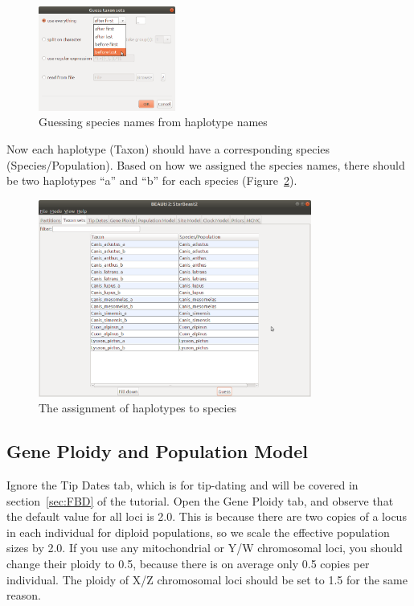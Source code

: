 \documentclass[12pt]{article}
\begin{document}
\begin{figure}[htb!]
\centering
\includegraphics[width=0.4\textwidth]{figures/guessTaxonMap.png}
\caption
{Guessing species names from haplotype names}
\label{fig:guessTaxonMap}
\end{figure}

Now each haplotype (Taxon) should have a corresponding species (Species/Population).
Based on how we assigned the species names, there should be two haplotypes
``a'' and ``b'' for each species (Figure~\ref{fig:taxonMap}).

\begin{figure}[htb!]
\centering
\includegraphics[width=0.8\textwidth]{figures/taxonMap.png}
\caption
{The assignment of haplotypes to species}
\label{fig:taxonMap}
\end{figure}

\clearpage

\subsection{Gene Ploidy and Population Model}
\label{subsec:ploidyAndPopModel}

Ignore the Tip Dates tab, which is for tip-dating and will be covered in
section~\ref{sec:FBD} of the tutorial. Open the Gene Ploidy tab, and observe that the default value
for all loci is 2.0. This is because there are two copies of a locus in each
individual for diploid populations, so we scale the effective population sizes
by 2.0. If you use any mitochondrial or Y/W chromosomal loci, you should
change their ploidy to 0.5, because there is on average only 0.5 copies per
individual. The ploidy of X/Z chromosomal loci should be set to 1.5 for the
same reason.
\end{document}
